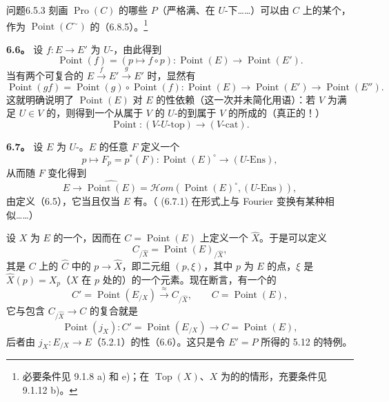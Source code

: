 \begin{SGAresult}{问题}{6.5.3}
刻画 $\operatorname{Pro}(C)$ 的哪些 $P$（严格满、在 $U$-下……）可以由 $C$ 上的某个，作为 $\operatorname{Point}(C^\sim)$ 的（6.8.5）。\footnote{必要条件见 9.1.8 a) 和 e)；在 $\operatorname{Top}(X)$、$X$ 为的的情形，充要条件见 9.1.12 b)。}
\end{SGAresult}

\textbf{6.6。} 设 $f:E\to E'$ 为 $U$-，由此得到
\[\operatorname{Point}(f)=(p\mapsto f\circ p):\operatorname{Point}(E)\longrightarrow\operatorname{Point}(E').\]
当有两个可复合的 $E\xrightarrow fE'\xrightarrow gE'$ 时，显然有
\[\operatorname{Point}(gf)=\operatorname{Point}(g)\circ\operatorname{Point}(f):\operatorname{Point}(E)\longrightarrow\operatorname{Point}(E')\longrightarrow\operatorname{Point}(E'').\]
这就明确说明了 $\operatorname{Point}(E)$ 对 $E$ 的性依赖（这一次并未简化用语）：若 $V$ 为满足 $U\in V$ 的，则得到一个从属于 $V$ 的 $U$-的到属于 $V$ 的所成的（真正的！）
\[\operatorname{Point}:(V\text{-}U\text{-}\mathrm{top})\longrightarrow(V\text{-}\mathrm{cat}).\]

\textbf{6.7。} 设 $E$ 为 $U$-。$E$ 的任意 $F$ 定义一个
\[p\longmapsto F_p=p^*(F):\operatorname{Point}(E)^\circ\longrightarrow(U\text{-}\mathrm{Ens}),\]
从而随 $F$ 变化得到
\[E\longrightarrow\widehat{\operatorname{Point}(E)}=\mathscr{H}om(\operatorname{Point}(E)^\circ,(U\text{-}\mathrm{Ens})),\tag{6.7.1}\]
由定义（6.5），它当且仅当 $E$ 有。（ (6.7.1) 在形式上与 Fourier 变换有某种相似……）

设 $X$ 为 $E$ 的一个，因而在 $C=\operatorname{Point}(E)$ 上定义一个 $\widehat X$。于是可以定义
\[C_{/\widehat X}=\operatorname{Point}(E)_{/\widehat X},\]
其是 $C$ 上的 $\widehat C$ 中的 $p\to\widehat X$，即二元组 $(p,\xi)$，其中 $p$ 为 $E$ 的点，$\xi$ 是 $\widehat X(p)=X_p$（$X$ 在 $p$ 处的）的一个元素。现在断言，有一个的
\[C'=\operatorname{Point}(E_{/X})\xrightarrow{\approx}C_{/\widehat X},\qquad C=\operatorname{Point}(E),\tag{6.7.2}\]
它与包含 $C_{/\widehat X}\to C$ 的复合就是
\[\operatorname{Point}(j_X):C'=\operatorname{Point}(E_{/X})\longrightarrow C=\operatorname{Point}(E),\]
后者由 $j_X:E_{/X}\to E$（5.2.1）的性（6.6）。这只是令 $E'=P$ 所得的 5.12 的特例。

